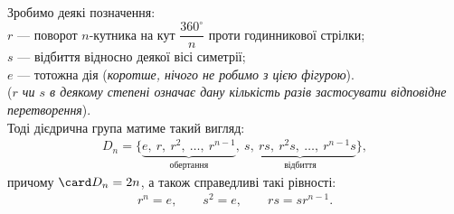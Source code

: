 \documentclass{math_library}
\begin{document}
\begin{theorem}
Зробимо деякі позначення:\\
$r$ --- поворот $n$-кутника на кут $\dfrac{360^\circ}{n}$ проти годинникової стрілки; \\
$s$ --- відбиття відносно деякої вісі симетрії;\\
$e$ --- тотожна дія (\textit{коротше, нічого не робимо з цією фігурою}).\\
(\textit{$r$ чи $s$ в деякому степені означає дану кількість разів застосувати відповідне перетворення}).\\
Тоді дієдрична група матиме такий вигляд:
\begin{align*}
D_n = \{ \underbrace{e,\ r,\ r^2,\ \dots,\ r^{n-1}}_{\text{обертання}},\ \underbrace{s,\ rs,\ r^2s,\ \dots,\ r^{n-1}s}_{\text{відбиття}} \},
\end{align*}
причому $\card D_{n} = 2n$, а також справедливі такі рівності:
\begin{align*}
r^n = e, \qquad s^2 = e, \qquad rs = sr^{n-1}.
\end{align*}

\end{theorem}

\begin{figure}[H]
\centering
{}
\qquad
{}
\end{figure}
\end{document}
